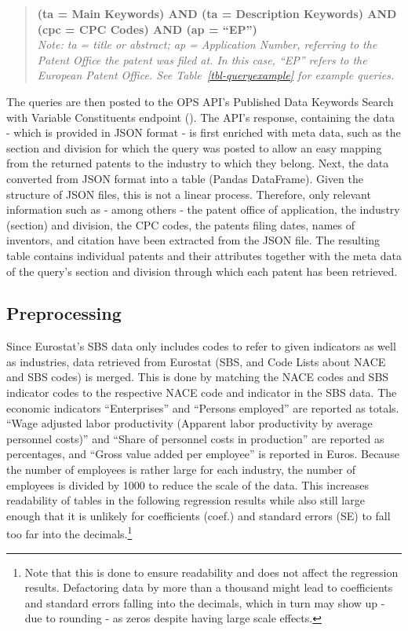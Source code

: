 \documentclass[
  12pt,
  a4paperpaper,
]{article}
\begin{document}

\begin{quote}
\textbf{(ta = Main Keywords) AND (ta = Description Keywords) AND (cpc =
CPC Codes) AND (ap = ``EP'')}\\
\emph{Note: ta = title or abstract; ap = Application Number, referring
to the Patent Office the patent was filed at. In this case, ``EP''
refers to the European Patent Office. See Table~\ref{tbl-queryexample}
for example queries.}
\end{quote}


The queries are then posted to the OPS API's Published Data Keywords
Search with Variable Constituents endpoint
(). The API's response, containing the data - which is
provided in JSON format - is first enriched with meta data, such as the
section and division for which the query was posted to allow an easy
mapping from the returned patents to the industry to which they belong.
Next, the data converted from JSON format into a table (Pandas
DataFrame). Given the structure of JSON files, this is not a linear
process. Therefore, only relevant information such as - among others -
the patent office of application, the industry (section) and division,
the CPC codes, the patents filing dates, names of inventors, and
citation have been extracted from the JSON file. The resulting table
contains individual patents and their attributes together with the meta
data of the query's section and division through which each patent has
been retrieved.

\subsection{Preprocessing}\label{sec-preprocessing}

Since Eurostat's SBS data only includes codes to refer to given
indicators as well as industries, data retrieved from Eurostat (SBS, and
Code Lists about NACE and SBS codes) is merged. This is done by matching
the NACE codes and SBS indicator codes to the respective NACE code and
indicator in the SBS data. The economic indicators ``Enterprises'' and
``Persons employed'' are reported as totals. ``Wage adjusted labor
productivity (Apparent labor productivity by average personnel costs)''
and ``Share of personnel costs in production'' are reported as
percentages, and ``Gross value added per employee'' is reported in
Euros. Because the number of employees is rather large for each
industry, the number of employees is divided by 1000 to reduce the scale
of the data. This increases readability of tables in the following
regression results while also still large enough that it is unlikely for
coefficients (coef.) and standard errors (SE) to fall too far into the
decimals.\footnote{Note that this is done to ensure readability and does
  not affect the regression results. Defactoring data by more than a
  thousand might lead to coefficients and standard errors falling into
  the decimals, which in turn may show up - due to rounding - as zeros
  despite having large scale effects.\label{note3}}
\end{document}
